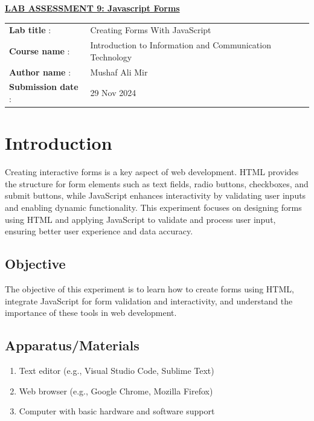 \documentclass[a4paper,9pt]{article}
\begin{document}
\newpage



\begin{center}
	{\Huge \bfseries \underline{ LAB ASSESSMENT 9: Javascript Forms } \par}
\end{center}
\noindent\begin{tabular}{@{}ll}
	\textbf{Lab title} :&Creating Forms With JavaScript \\
	\textbf{Course name} :&  Introduction to Information and Communication Technology\\
	\textbf{Author name} : & Mushaf Ali Mir\\
	\textbf{Submission date} :& 29 Nov 2024 \\
\end{tabular}

\section*{Introduction}
\setcounter{section}{9}
\setcounter{figure}{0}  %
\setcounter{subsection}{0}

Creating interactive forms is a key aspect of web development. HTML provides the structure for form elements such as text fields, radio buttons, checkboxes, and submit buttons, while JavaScript enhances interactivity by validating user inputs and enabling dynamic functionality. This experiment focuses on designing forms using HTML and applying JavaScript to validate and process user input, ensuring better user experience and data accuracy.

\subsection{Objective}
The objective of this experiment is to learn how to create forms using HTML, integrate JavaScript for form validation and interactivity, and understand the importance of these tools in web development.

\subsection{Apparatus/Materials}
\begin{enumerate}
	\item Text editor (e.g., Visual Studio Code, Sublime Text)
	\item Web browser (e.g., Google Chrome, Mozilla Firefox)
	\item Computer with basic hardware and software support
	
\end{enumerate}
\end{document}
